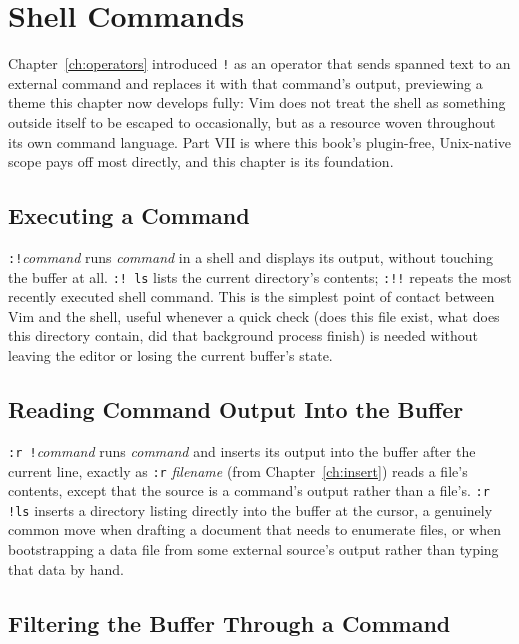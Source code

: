 \chapter{Shell Commands}
\label{ch:shell}

Chapter~\ref{ch:operators} introduced \texttt{!} as an operator that sends spanned text to an external command and replaces it with that command's output, previewing a theme this chapter now develops fully: Vim does not treat the shell as something outside itself to be escaped to occasionally, but as a resource woven throughout its own command language. Part VII is where this book's plugin-free, Unix-native scope pays off most directly, and this chapter is its foundation.

\section{Executing a Command}

\texttt{:!}\textit{command} runs \textit{command} in a shell and displays its output, without touching the buffer at all. \texttt{:! ls} lists the current directory's contents; \texttt{:!!} repeats the most recently executed shell command. This is the simplest point of contact between Vim and the shell, useful whenever a quick check (does this file exist, what does this directory contain, did that background process finish) is needed without leaving the editor or losing the current buffer's state.

\section{Reading Command Output Into the Buffer}

\texttt{:r !}\textit{command} runs \textit{command} and inserts its output into the buffer after the current line, exactly as \texttt{:r} \textit{filename} (from Chapter~\ref{ch:insert}) reads a file's contents, except that the source is a command's output rather than a file's. \texttt{:r !ls} inserts a directory listing directly into the buffer at the cursor, a genuinely common move when drafting a document that needs to enumerate files, or when bootstrapping a data file from some external source's output rather than typing that data by hand.

\section{Filtering the Buffer Through a Command}

